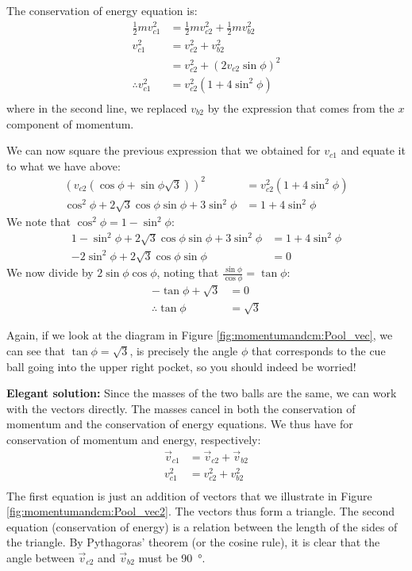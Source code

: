\begin{solution}
The conservation of energy equation is:
\begin{align*}
\frac{1}{2}mv_{c1}^2&=\frac{1}{2}mv_{c2}^2+\frac{1}{2}mv_{b2}^2\\
v_{c1}^2&=v_{c2}^2+v_{b2}^2\\
&=v_{c2}^2+(2v_{c2}\sin\phi)^2\\
\therefore v_{c1}^2&=v_{c2}^2(1+4\sin^2\phi)\\
\end{align*}
where in the second line, we replaced $v_{b2}$ by the expression that comes from the $x$ component of momentum.

We can now square the previous expression that we obtained for $v_{c1}$ and equate it to what we have above:
\begin{align*}
\left( v_{c2}(\cos\phi+\sin\phi\sqrt 3) \right)^2&=v_{c2}^2(1+4\sin^2\phi)\\
\cos^2\phi+2\sqrt 3\cos\phi\sin\phi+3\sin^2\phi &= 1+4\sin^2\phi
\end{align*}
We note that $\cos^2\phi=1-\sin^2\phi$:
\begin{align*}
1-\sin^2\phi+2\sqrt 3\cos\phi\sin\phi+3\sin^2\phi &= 1+4\sin^2\phi\\
-2\sin^2\phi+2\sqrt 3\cos\phi\sin\phi&=0
\end{align*}
We now divide by $2\sin\phi\cos\phi$, noting that $\frac{\sin\phi}{\cos\phi}=\tan\phi$:
\begin{align*}
-\tan\phi+\sqrt 3&=0\\
\therefore \tan\phi&=\sqrt 3
\end{align*}

Again, if we look at the diagram in Figure \ref{fig:momentumandcm:Pool_vec}, we can see that $\tan\phi=\sqrt 3$, is precisely the angle $\phi$ that corresponds to the cue ball going into the upper right pocket, so you should indeed be worried!

\textbf{Elegant solution:}
Since the masses of the two balls are the same, we can work with the vectors directly. The masses cancel in both the conservation of momentum and the conservation of energy equations. We thus have for conservation of momentum and energy, respectively:
\begin{align*}
\vec v_{c1}&=\vec v_{c2}+\vec v_{b2}\\
v_{c1}^2 &= v_{c2}^2  + v_{b2}^2 \\
\end{align*}
The first equation is just an addition of vectors that we illustrate in Figure \ref{fig:momentumandcm:Pool_vec2}. 
The vectors thus form a triangle. The second equation (conservation of energy) is a relation between the length of the sides of the triangle. By Pythagoras' theorem (or the cosine rule), it is clear that the angle between $\vec v_{c2}$ and $\vec v_{b2}$ must be \SI{90}{\degree}.


\end{solution}
